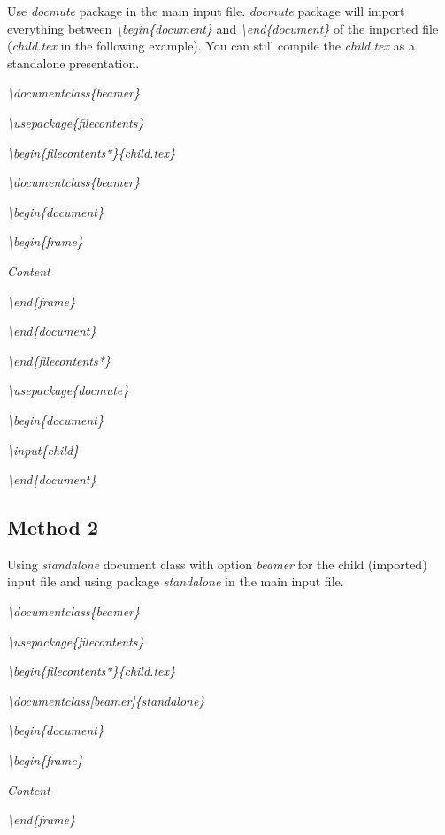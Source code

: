 Use \emph{docmute} package in the main input file. \emph{docmute}
package will import everything between
\emph{\textbackslash{}begin\{document\}} and
\emph{\textbackslash{}end\{document\}} of the imported file
(\emph{child.tex} in the following example). You can still compile the
\emph{child.tex} as a standalone presentation.

\emph{\textbackslash{}documentclass\{beamer\}}

\emph{\textbackslash{}usepackage\{filecontents\}}

\emph{\textbackslash{}begin\{filecontents*\}\{child.tex\}}

\emph{\textbackslash{}documentclass\{beamer\}}

\emph{\textbackslash{}begin\{document\}}

\emph{ \textbackslash{}begin\{frame\}}

\emph{ Content}

\emph{ \textbackslash{}end\{frame\}}

\emph{\textbackslash{}end\{document\}}

\emph{\textbackslash{}end\{filecontents*\}}

\emph{\textbackslash{}usepackage\{docmute\}}

\emph{\textbackslash{}begin\{document\}}

\emph{ \textbackslash{}input\{child\}}

\emph{\textbackslash{}end\{document\}}

\subsection{Method 2}\label{method-2}

Using \emph{standalone} document class with option \emph{beamer} for the
child (imported) input file and using package \emph{standalone} in the
main input file.

\emph{\textbackslash{}documentclass\{beamer\}}

\emph{\textbackslash{}usepackage\{filecontents\}}

\emph{\textbackslash{}begin\{filecontents*\}\{child.tex\}}

\emph{\textbackslash{}documentclass{[}beamer{]}\{standalone\}}

\emph{\textbackslash{}begin\{document\}}

\emph{ \textbackslash{}begin\{frame\}}

\emph{ Content}

\emph{ \textbackslash{}end\{frame\}}


